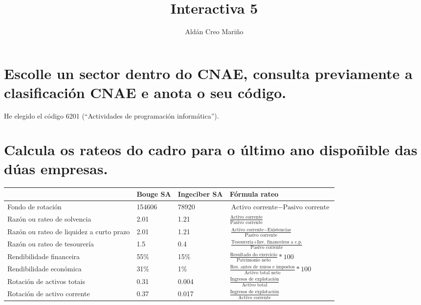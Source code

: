 \documentclass[a4paper]{article}
\title{Interactiva 5}
\author{Aldán Creo Mariño}
\begin{document}
\maketitle

\section{Escolle un sector dentro do CNAE, consulta previamente a clasificación CNAE e anota o seu código.}

He elegido el código 6201 (``Actividades de programación informática'').

\section{Calcula os rateos do cadro para o último ano dispoñible das dúas empresas.}

\begin{center}
    \begin{tabular}{ | p{5cm} | p{2cm} | p{2cm} | p{5cm} | }
        \hline
      & Bouge SA & Ingeciber SA & Fórmula rateo \\ \hline
      Fondo de rotación & 154606 & 78920 & $\text{Activo corrente} - \text{Pasivo corrente}$ \\ \hline
      Razón ou rateo de solvencia & 2.01 & 1.21 & $\frac{\text{Activo corrente}}{\text{Pasivo corrente}}$ \\ \hline
      Razón ou rateo de liquidez a curto prazo & 2.01 & 1.21 & $\frac{\text{Activo corrente} - \text{Existencias}}{\text{Pasivo corrente}}$ \\ \hline
      Razón ou rateo de tesourería & 1.5 & 0.4 & $\frac{\text{Tesourería} + \text{Inv. financeiros a c.p.}}{\text{Pasivo corrente}}$ \\ \hline
      Rendibilidade financeira & 55\% & 15\% & $\frac{\text{Resultado do exercicio}}{\text{Patrimonio neto}}*100$ \\ \hline
      Rendibilidade económica & 31\% & 1\% & $\frac{\text{Res. antes de xuros e impostos}}{\text{Activo total neto}}*100$ \\ \hline
      Rotación de activos totais & 0.31 & 0.004 & $\frac{\text{Ingresos de explotación}}{\text{Activo total}}$ \\ \hline
      Rotación de activo corrente & 0.37 & 0.017 & $\frac{\text{Ingresos de explotación}}{\text{Activo corrente}}$ \\ \hline
    \end{tabular}
\end{center}
\end{document}
